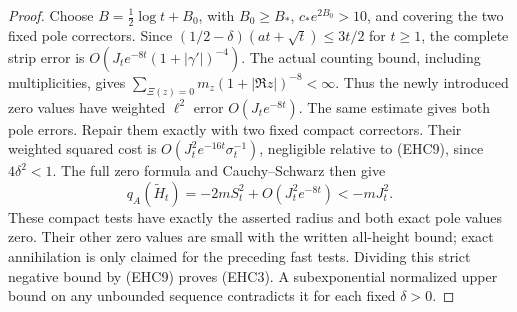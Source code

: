 \documentclass[11pt]{article}
\theoremstyle{remark}\newtheorem{remark}[theorem]{Remark}
\begin{document}
\begin{proof}
Choose $B=\tfrac12\log t+B_0$, with $B_0\ge B_*$,
$c_*e^{2B_0}>10$, and covering the two fixed pole
correctors. Since
$(1/2-\delta)(at+\sqrt t)\le3t/2$ for $t\ge1$,
the complete strip error is
$O(J_t e^{-8t}(1+|\gamma'|)^{-4})$.
The actual counting bound, including multiplicities,
gives
$\sum_{\Xi(z)=0}m_z(1+|\Re z|)^{-8}<\infty$.
Thus the newly introduced zero values have weighted
$\ell^2$ error $O(J_t e^{-8t})$.
The same estimate gives both pole errors.
Repair them exactly with two fixed compact correctors.
Their weighted squared cost is
$O(J_t^2e^{-16t}\sigma_t^{-1})$, negligible relative
to (EHC9), since $4\delta^2<1$.
The full zero formula and Cauchy--Schwarz then give
\[
 q_A(\widetilde H_t)=-2mS_t^2+
                              O(J_t^2e^{-8t})<-mJ_t^2 .
\]
These compact tests have exactly the asserted radius
and both exact pole values zero. Their other zero values
are small with the written all-height bound; exact
annihilation is only claimed for the preceding fast tests.
Dividing this strict negative bound by (EHC9) proves (EHC3).
A subexponential normalized upper bound on any unbounded
sequence contradicts it for each fixed $\delta>0$.
\end{proof}
\end{document}
